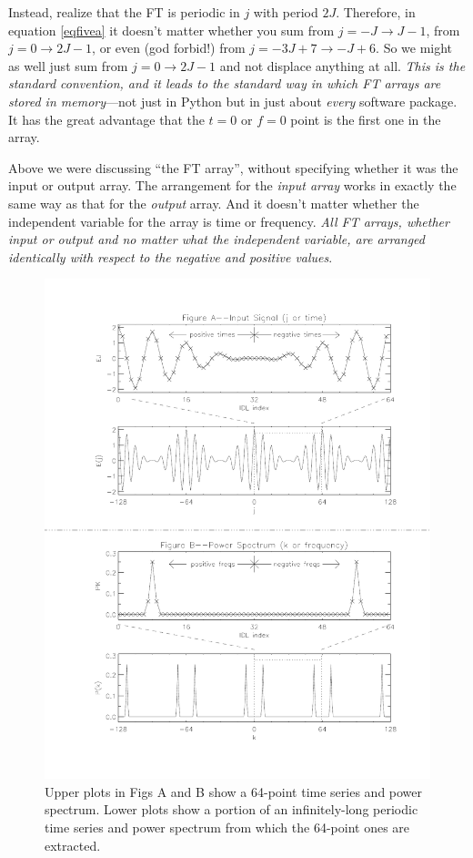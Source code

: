 \documentclass[11pt,preprint]{aastex}
\begin{document}
          Instead, realize that the FT is periodic in $j$ with period
$2J$.  Therefore, in equation \ref{eqfivea} it doesn't matter whether you sum from
$j = -J \to J-1$, from $j = 0 \to 2J-1$, or even (god forbid!) from $j =
-3J + 7 \to -J + 6$.  So we might as well just sum from $j = 0 \to 2J-1$
and not displace anything at all.  {\it This is the standard convention,
and it leads to the standard way in which FT arrays are stored in
memory}---not just in Python but in just about {\it every} software
package.  It has the great advantage that the $t=0$ or $f=0$ point is
the first one in the array. 

          Above we were discussing ``the FT array'', without specifying
whether it was the input or output array.  The arrangement for the {\it
input array} works in exactly the same way as that for the {\it output}
array.  And it doesn't matter whether the independent variable for the
array is time or frequency.  {\it All FT arrays, whether input or output
and no matter what the independent variable, are arranged {\it
identically} with respect to the negative and positive values}. 

\begin{figure}[H]
\begin{center}
\leavevmode
\includegraphics[width=6.0in]{fourierbfig.pdf}
\end{center}
\label{figtwo}
\caption{Upper plots in Figs A and B show a 64-point time series and
power spectrum. Lower plots show a portion of an infinitely-long
periodic time series and power spectrum from which the 64-point ones are
extracted.  }
\end{figure}
\end{document}
